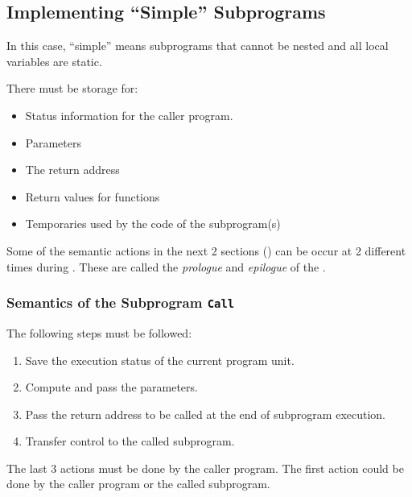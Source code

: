 \subsection{Implementing ``Simple'' Subprograms}\label{subsec:Implementing_Simple_Subprograms}
In this case, ``simple'' means subprograms that cannot be nested and all local variables are static.

There must be storage for:
\begin{itemize}[noitemsep]
\item Status information for the caller program.
\item Parameters
\item The return  address
\item Return values for functions
\item Temporaries used by the code of the subprogram(s)
\end{itemize}

Some of the semantic actions in the next 2 sections () can be occur at 2 different times during .
These are called the \emph{prologue} and \emph{epilogue} of the .

\subsubsection{Semantics of the Subprogram \texttt{Call}}\label{subsubsec:Implementing_Simple_Subprogram-Call}
The following steps must be followed:
\begin{enumerate}[noitemsep]
\item Save the execution status of the current program unit.
\item Compute and pass the parameters.
\item Pass the return address to be called at the end of subprogram execution.
\item Transfer control to the called subprogram.
\end{enumerate}

The last 3 actions must be done by the caller program.
The first action could be done by the caller program or the called subprogram.

